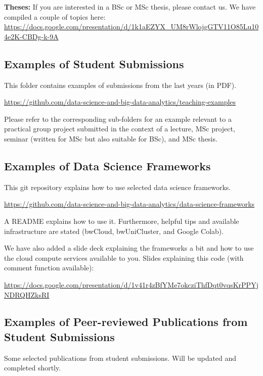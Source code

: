 \documentclass[sigconf, nonacm]{acmart}
\begin{document}
\textbf{Theses:}
If you are interested in a BSc or MSc thesis, please contact us. 
We have compiled a couple of topics here:
\url{https://docs.google.com/presentation/d/1k1aEZYX_UM8rWlojgGTV11O85Lu104e2K-CBDg-k-9A}



\subsection{Examples of Student Submissions}

This folder contains examples of submissions from the last years (in PDF). 

\url{https://github.com/data-science-and-big-data-analytics/teaching-examples}

Please refer to the corresponding sub-folders for an example relevant to a practical group project submitted in the context of a lecture, MSc project, seminar (written for MSc but also suitable for BSc), and MSc thesis.



\subsection{Examples of Data Science Frameworks}

This git repository explains how to use selected data science frameworks. 

\url{https://github.com/data-science-and-big-data-analytics/data-science-frameworks}

A README explains how to use it.
Furthermore, helpful tips and available infrastructure are stated (bwCloud, bwUniCluster, and Google Colab).

We have also added a slide deck explaining the frameworks a bit and how to use the cloud compute services available to you.
Slides explaining this code (with comment function available):

\url{https://docs.google.com/presentation/d/1v41r4zBfYMe7okcziThfDqt0vqsKrPPYjNDRQHZksRI}


\subsection{Examples of Peer-reviewed Publications from Student Submissions}

Some selected publications from student submissions.
Will be updated and completed shortly.
\end{document}
